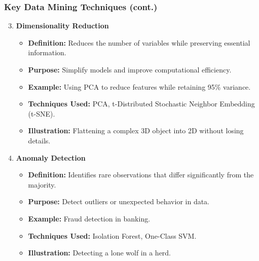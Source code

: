 \documentclass[aspectratio=169]{beamer}
\begin{document}
\begin{frame}[fragile]
  \frametitle{Key Data Mining Techniques (cont.)}
  \begin{enumerate}
    \setcounter{enumi}{2} %
    \item \textbf{Dimensionality Reduction}
      \begin{itemize}
        \item \textbf{Definition:} Reduces the number of variables while preserving essential information.
        \item \textbf{Purpose:} Simplify models and improve computational efficiency.
        \item \textbf{Example:} Using PCA to reduce features while retaining 95\% variance.
        \item \textbf{Techniques Used:} PCA, t-Distributed Stochastic Neighbor Embedding (t-SNE).
        \item \textbf{Illustration:} Flattening a complex 3D object into 2D without losing details.
      \end{itemize}

    \item \textbf{Anomaly Detection}
      \begin{itemize}
        \item \textbf{Definition:} Identifies rare observations that differ significantly from the majority.
        \item \textbf{Purpose:} Detect outliers or unexpected behavior in data.
        \item \textbf{Example:} Fraud detection in banking.
        \item \textbf{Techniques Used:} Isolation Forest, One-Class SVM.
        \item \textbf{Illustration:} Detecting a lone wolf in a herd.
      \end{itemize}
  \end{enumerate}
\end{frame}
\end{document}
